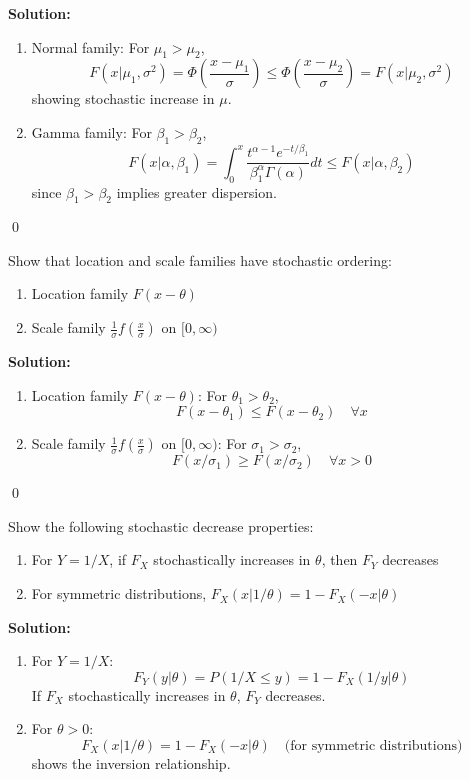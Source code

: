 \noindent\textbf{Solution:}
\begin{enumerate}[label=(\alph*)]
\item Normal family: For $\mu_1 > \mu_2$,
\[
F(x|\mu_1,\sigma^2) = \Phi\left(\frac{x-\mu_1}{\sigma}\right) \leq \Phi\left(\frac{x-\mu_2}{\sigma}\right) = F(x|\mu_2,\sigma^2)
\]
showing stochastic increase in $\mu$.

\item Gamma family: For $\beta_1 > \beta_2$,
\[
F(x|\alpha,\beta_1) = \int_0^x \frac{t^{\alpha-1}e^{-t/\beta_1}}{\beta_1^\alpha\Gamma(\alpha)}dt \leq F(x|\alpha,\beta_2)
\]
since $\beta_1 > \beta_2$ implies greater dispersion.
\end{enumerate}


\qed
\begin{problembox}
Show that location and scale families have stochastic ordering:
\begin{enumerate}[label=(\alph*)]
\item Location family $F(x-\theta)$
\item Scale family $\frac{1}{\sigma}f\left(\frac{x}{\sigma}\right)$ on $[0,\infty)$
\end{enumerate}
\end{problembox}

\noindent\textbf{Solution:}
\begin{enumerate}[label=(\alph*)]
\item Location family $F(x-\theta)$: For $\theta_1 > \theta_2$,
\[
F(x-\theta_1) \leq F(x-\theta_2) \quad \forall x
\]

\item Scale family $\frac{1}{\sigma}f\left(\frac{x}{\sigma}\right)$ on $[0,\infty)$: For $\sigma_1 > \sigma_2$,
\[
F(x/\sigma_1) \geq F(x/\sigma_2) \quad \forall x > 0
\]
\end{enumerate}


\qed
\begin{problembox}
Show the following stochastic decrease properties:
\begin{enumerate}[label=(\alph*)]
\item For $Y = 1/X$, if $F_X$ stochastically increases in $\theta$, then $F_Y$ decreases
\item For symmetric distributions, $F_X(x|1/\theta) = 1 - F_X(-x|\theta)$
\end{enumerate}
\end{problembox}

\noindent\textbf{Solution:}
\begin{enumerate}[label=(\alph*)]
\item For $Y = 1/X$:
\[
F_Y(y|\theta) = P(1/X \leq y) = 1 - F_X(1/y|\theta)
\]
If $F_X$ stochastically increases in $\theta$, $F_Y$ decreases.

\item For $\theta > 0$:
\[
F_X(x|1/\theta) = 1 - F_X(-x|\theta) \quad \text{(for symmetric distributions)}
\]
shows the inversion relationship.
\end{enumerate}



